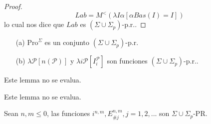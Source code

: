 \begin{lemma}
\begin{proof}
    \[
      \displaystyle Lab=M^{< }\left( \lambda I\alpha \left[ \alpha Bas(I)=I\right] \right)
    \]
    lo cual nos dice que $Lab$ es $(\Sigma \cup \Sigma _{p})$-p.r..
  \end{proof}
  \end{lemma}


  \begin{lemma}
    \par
    \begin{itemize}
      \item[(a)]  $\mathrm{Pro}^{\Sigma }$ es un conjunto $(\Sigma \cup \Sigma _{p}) $-p.r.
      \item[(b)]  $\lambda \mathcal{P}\left[ n(\mathcal{P})\right] $ y $\lambda i \mathcal{P}\left[ I_{i}
                  ^{\mathcal{P}}\right] $ son funciones $(\Sigma \cup \Sigma _{p})$-p.r..
    \end{itemize}
  \end{lemma}

  \begin{lemma}
    \par Este lemma no se evalua.
  \end{lemma}

  \begin{lemma}
    \par Este lemma no se evalua.
  \end{lemma}

  \begin{proposition}
    Sean $n, m \leq 0$, las funciones $i^{n, m}, E_{\#j}^{n, m}, j = 1, 2, ...$ son $\Sigma \cup \Sigma_{p}$-PR.
  \end{proposition}

